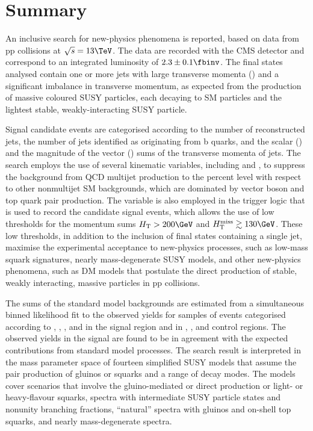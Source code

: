 \section{Summary}
\label{sec:summary}

An inclusive search for new-physics phenomena is reported, based on
data from pp collisions at $\sqrt{s} = 13\TeV$. The data are recorded
with the CMS detector and correspond to an integrated luminosity of
$2.3 \pm 0.1 \fbinv$. The final states analysed contain one or more
jets with large transverse momenta (\Pt) and a significant imbalance
in transverse momentum, as expected from the production of massive
coloured SUSY particles, each decaying to SM particles and the lightest
stable, weakly-interacting SUSY particle.

Signal candidate events are categorised according to the number of
reconstructed jets, the number of jets identified as originating from
b quarks, and the scalar (\scalht) and the magnitude of the vector
(\HTmiss) sums of the transverse momenta of jets.  The search employs
the use of several kinematic variables, including \alphat and \bdphi,
to suppress the background from QCD multijet production to the percent
level with respect to other nonmultijet SM backgrounds, which are
dominated by vector boson and top quark pair production. The \alphat
variable is also employed in the trigger logic that is used to record
the candidate signal events, which allows the use of low thresholds
for the momentum sums $\scalht > 200\GeV$ and $\HTmiss \gtrsim
130\GeV$. These low thresholds, in addition to the inclusion of final
states containing a single jet, maximise the experimental acceptance
to new-physics processes, such as low-mass squark signatures, nearly
mass-degenerate SUSY models, and other new-physics phenomena, such as
DM models that postulate the direct production of stable, weakly
interacting, massive particles in pp collisions.

The sums of the standard model backgrounds are estimated from a
simultaneous binned likelihood fit to the observed yields for samples
of events categorised according to \njet, \nb, \scalht, and \HTmiss in
the signal region and in \mj, \mmj, and \gj control regions. The
observed yields in the signal are found to be in agreement with the
expected contributions from standard model processes.  The search
result is interpreted in the mass parameter space of fourteen
simplified SUSY models that assume the pair production of
gluinos or squarks and a range of decay modes. The models cover
scenarios that involve the gluino-mediated or direct production or
light- or heavy-flavour squarks, spectra with intermediate SUSY particle
states and nonunity branching fractions, ``natural'' spectra with
gluinos and on-shell top squarks, and nearly mass-degenerate spectra.

